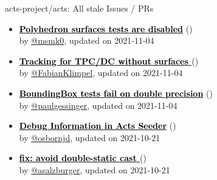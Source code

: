 \begin{frame}[allowframebreaks]{ acts-project/acts: All stale Issues / PRs}
\begin{itemize}
    \item\iss\prstale\textbf{\href{https://github.com/acts-project/acts/issues/454}{\textcolor{black}{Polyhedron surfaces tests are disabled}}}
    (\href{https://github.com/acts-project/acts/issues/454}{}) \\
    by \href{https://github.com/msmk0}{@msmk0}, updated on 2021-11-04

    \item\iss\prstale\textbf{\href{https://github.com/acts-project/acts/issues/165}{\textcolor{black}{Tracking for TPC/DC without surfaces }}}
    (\href{https://github.com/acts-project/acts/issues/165}{}) \\
    by \href{https://github.com/FabianKlimpel}{@FabianKlimpel}, updated on 2021-11-04

    \item\iss\prstale\textbf{\href{https://github.com/acts-project/acts/issues/752}{\textcolor{black}{BoundingBox tests fail on double precision}}}
    (\href{https://github.com/acts-project/acts/issues/752}{}) \\
    by \href{https://github.com/paulgessinger}{@paulgessinger}, updated on 2021-11-04

    \item\iss\prstale\textbf{\href{https://github.com/acts-project/acts/issues/944}{\textcolor{black}{Debug Information in Acts Seeder}}}
    (\href{https://github.com/acts-project/acts/issues/944}{}) \\
    by \href{https://github.com/osbornjd}{@osbornjd}, updated on 2021-10-21

    \item\iss\prstale\textbf{\href{https://github.com/acts-project/acts/issues/647}{\textcolor{black}{fix: avoid double-static cast }}}
    (\href{https://github.com/acts-project/acts/issues/647}{}) \\
    by \href{https://github.com/asalzburger}{@asalzburger}, updated on 2021-10-21

  \end{itemize}
\end{frame}
